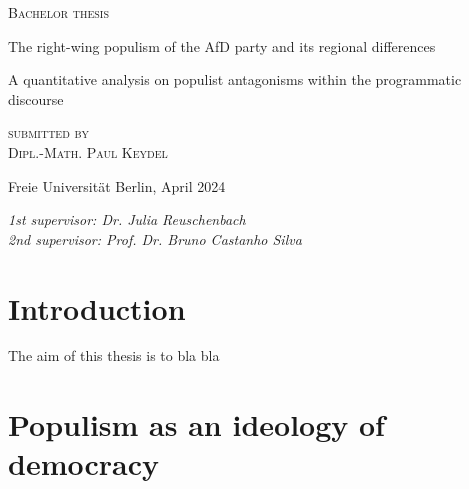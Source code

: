 \documentclass[a4paper]{scrreprt}
\begin{document}
\begin{titlepage}
\centering
{\large\textsc{Bachelor thesis}\par}
\vspace{8\baselineskip}
{\Huge The right-wing populism of the AfD party and its regional differences\par}
\vspace{2\baselineskip}
{\Large A quantitative analysis on populist antagonisms within the programmatic discourse\par}
\vspace{5\baselineskip}
{\large\textsc{submitted by\\[.5em]Dipl.-Math. Paul Keydel}\par}
\vspace{8\baselineskip}
{Freie Universität Berlin, April 2024\par}
\vfill
\raggedright
{\em 1st supervisor: Dr. Julia Reuschenbach\\}
{\em 2nd supervisor: Prof. Dr. Bruno Castanho Silva}
\end{titlepage}

\tableofcontents

\chapter{Introduction}
The aim of this thesis is to bla bla
\chapter{Populism as an ideology of democracy}
\end{document}
